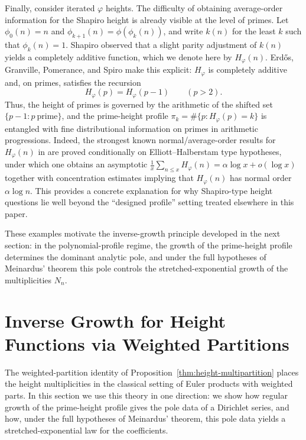 \documentclass[11pt]{article}
\theoremstyle{definition}
\begin{document}
Finally, consider iterated $\varphi$ heights.  The difficulty of obtaining average-order information for the Shapiro height
is already visible at the level of primes.  Let $\phi_0(n)=n$ and
$\phi_{k+1}(n)=\phi(\phi_k(n))$, and write $k(n)$ for the least $k$ such that
$\phi_k(n)=1$. Shapiro observed that a slight parity adjustment of $k(n)$ yields a completely
additive function, which we denote here by $H_\varphi(n)$.  Erd\H{o}s, Granville, Pomerance, and Spiro make this explicit: $H_\varphi$ is completely
additive and, on primes, satisfies the recursion
\[
  H_\varphi(p)=H_\varphi(p-1)\qquad(p>2).
\]
Thus, the height of primes is governed by the arithmetic of the shifted set
$\{p-1:p\ \text{prime}\}$, and the prime-height profile
$\pi_k=\#\{p:H_\varphi(p)=k\}$ is entangled with fine distributional
information on primes in arithmetic progressions.
Indeed, the strongest known normal/average-order results for $H_\varphi(n)$ in
\cite{erdos} are proved conditionally on Elliott--Halberstam type hypotheses,
under which one obtains an asymptotic
$\frac1x\sum_{n\le x}H_\varphi(n)=\alpha\log x+o(\log x)$ together with
concentration estimates implying that $H_\varphi(n)$ has normal order
$\alpha\log n$.
This provides a concrete explanation for why Shapiro-type height questions lie
well beyond the ``designed profile'' setting treated elsewhere in this paper.



These examples motivate the inverse-growth principle developed in the next
section: in the polynomial-profile regime, the growth of the prime-height profile
determines the dominant analytic pole, and under the full hypotheses of
Meinardus' theorem this pole controls the stretched-exponential growth of the
multiplicities $N_n$.  

\section{Inverse Growth for Height Functions via Weighted Partitions}
\label{sec6}

The weighted-partition identity of Proposition~\ref{thm:height-multipartition}
places the height multiplicities in the classical setting of Euler products with
weighted parts.  In this section we use this theory in one direction: we show how
regular growth of the prime-height profile gives the pole data of a Dirichlet
series, and how, under the full hypotheses of Meinardus' theorem, this pole data
yields a stretched-exponential law for the coefficients.
\end{document}
